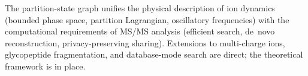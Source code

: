 \documentclass[twocolumn,10pt,a4paper]{article}
\theoremstyle{thmstyle}
\theoremstyle{definition}
\theoremstyle{remark}
\begin{document}
The partition-state graph unifies the physical description of ion
dynamics (bounded phase space, partition Lagrangian, oscillatory
frequencies) with the computational requirements of MS/MS analysis
(efficient search, de~novo reconstruction, privacy-preserving sharing).
Extensions to multi-charge ions, glycopeptide fragmentation, and
database-mode search are direct; the theoretical framework is in place.



\end{document}
